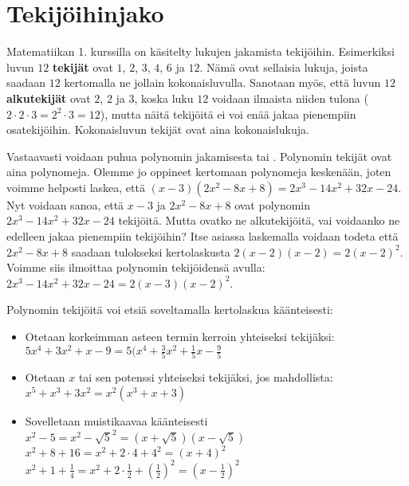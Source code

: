 
\section{Tekijöihinjako}

Matematiikan 1. kurssilla on käsitelty lukujen jakamista tekijöihin.
Esimerkiksi luvun $12$ {\bf tekijät} ovat $1$, $2$, $3$, $4$, $6$ ja $12$. Nämä ovat sellaisia
lukuja, joista saadaan $12$ kertomalla ne jollain kokonaisluvulla. Sanotaan myös, että luvun $12$
{\bf alkutekijät} ovat $2$, $2$ ja $3$, koska luku $12$ voidaan
ilmaista niiden tulona ($2\cdot 2\cdot 3 = 2^2\cdot 3 = 12$), mutta näitä tekijöitä ei
voi enää jakaa pienempiin osatekijöihin. Kokonaisluvun tekijät ovat aina kokonaislukuja.

Vastaavasti voidaan puhua polynomin jakamisesta  tai
. Polynomin tekijät
ovat aina polynomeja. Olemme jo oppineet kertomaan polynomeja keskenään,
joten voimme helposti laskea, että $(x-3)(2x^2-8x+8)=2x^3-14x^2+32x-24$.
Nyt voidaan sanoa, että $x-3$ ja $2x^2-8x+8$ ovat polynomin $2x^3-14x^2+32x-24$ tekijöitä.
Mutta ovatko ne alkutekijöitä, vai voidaanko ne edelleen jakaa pienempiin tekijöihin?
Itse asiassa laskemalla voidaan todeta että $2x^2-8x+8$ saadaan tulokseksi kertolaskusta $2(x-2)(x-2)=2(x-2)^2$.
Voimme siis ilmoittaa polynomin tekijöidensä avulla: $2x^3-14x^2+32x-24=2(x-3)(x-2)^2$.

Polynomin tekijöitä voi etsiä soveltamalla kertolaskua käänteisesti:

\begin{itemize}
\item Otetaan korkeimman asteen termin kerroin yhteiseksi tekijäksi: \\
$5x^4+3x^2+x-9 = 5(x^4+\frac{3}{5} x^2+\frac{1}{5} x-\frac{9}{5}$
\item Otetaan $x$ tai sen potenssi yhteiseksi tekijäksi, jos mahdollista: \\
$x^5+x^3+3x^2 = x^2(x^3+x+3)$
\item Sovelletaan muistikaavaa käänteisesti \\
$x^2-5=x^2-\sqrt{5}^2=(x+\sqrt{5})(x-\sqrt{5})$ \\
$x^2+8+16=x^2+2\cdot 4+4^2=(x+4)^2$ \\
$x^2+1+\frac14=x^2+2\cdot \frac12+(\frac12)^2=(x-\frac12)^2$
\end{itemize}

